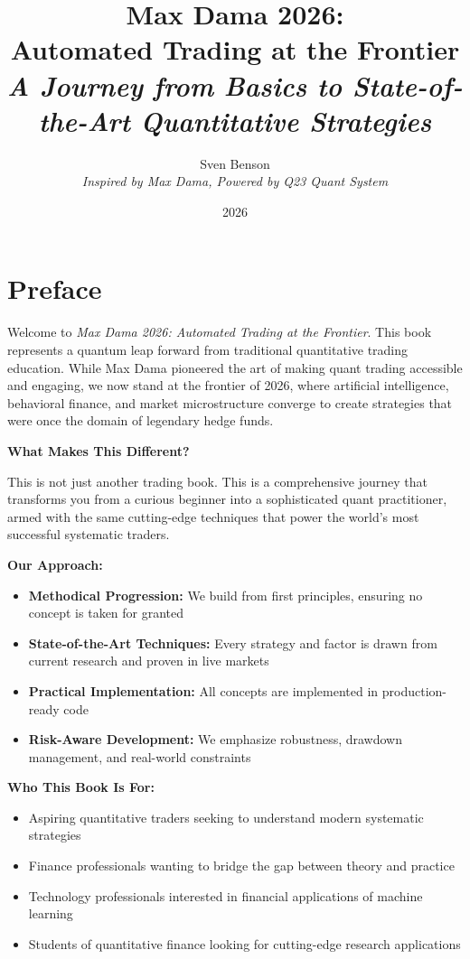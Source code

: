 \documentclass[11pt,letterpaper]{book}
\title{Max Dama 2026: \\
Automated Trading at the Frontier \\
\textit{A Journey from Basics to State-of-the-Art Quantitative Strategies}}
\author{Sven Benson \\
\textit{Inspired by Max Dama, Powered by Q23 Quant System}}
\date{2026}
\begin{document}
\maketitle

\tableofcontents

\chapter*{Preface}

Welcome to \textit{Max Dama 2026: Automated Trading at the Frontier}. This book represents a quantum leap forward from traditional quantitative trading education. While Max Dama pioneered the art of making quant trading accessible and engaging, we now stand at the frontier of 2026, where artificial intelligence, behavioral finance, and market microstructure converge to create strategies that were once the domain of legendary hedge funds.

\textbf{What Makes This Different?}

This is not just another trading book. This is a comprehensive journey that transforms you from a curious beginner into a sophisticated quant practitioner, armed with the same cutting-edge techniques that power the world's most successful systematic traders.

\textbf{Our Approach:}
\begin{itemize}
    \item \textbf{Methodical Progression:} We build from first principles, ensuring no concept is taken for granted
    \item \textbf{State-of-the-Art Techniques:} Every strategy and factor is drawn from current research and proven in live markets
    \item \textbf{Practical Implementation:} All concepts are implemented in production-ready code
    \item \textbf{Risk-Aware Development:} We emphasize robustness, drawdown management, and real-world constraints
\end{itemize}

\textbf{Who This Book Is For:}
\begin{itemize}
    \item Aspiring quantitative traders seeking to understand modern systematic strategies
    \item Finance professionals wanting to bridge the gap between theory and practice
    \item Technology professionals interested in financial applications of machine learning
    \item Students of quantitative finance looking for cutting-edge research applications
\end{itemize}
\end{document}
